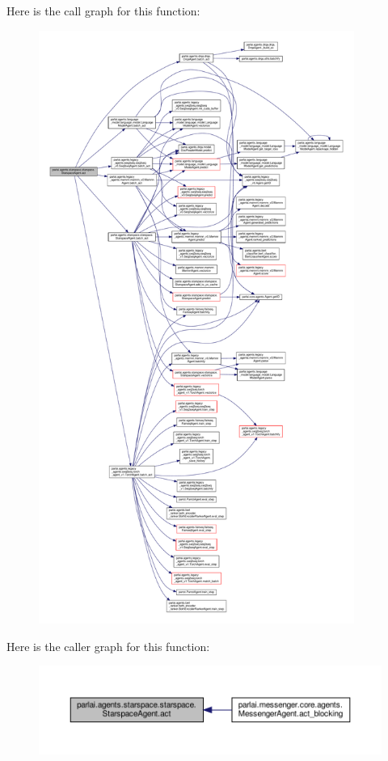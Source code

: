 Here is the call graph for this function\+:
\nopagebreak
\begin{figure}[H]
\begin{center}
\leavevmode
\includegraphics[height=550pt]{classparlai_1_1agents_1_1starspace_1_1starspace_1_1StarspaceAgent_aff87fb1b28e798a9ca28a0dc3fbb2f22_cgraph}
\end{center}
\end{figure}
Here is the caller graph for this function\+:
\nopagebreak
\begin{figure}[H]
\begin{center}
\leavevmode
\includegraphics[width=350pt]{classparlai_1_1agents_1_1starspace_1_1starspace_1_1StarspaceAgent_aff87fb1b28e798a9ca28a0dc3fbb2f22_icgraph}
\end{center}
\end{figure}
